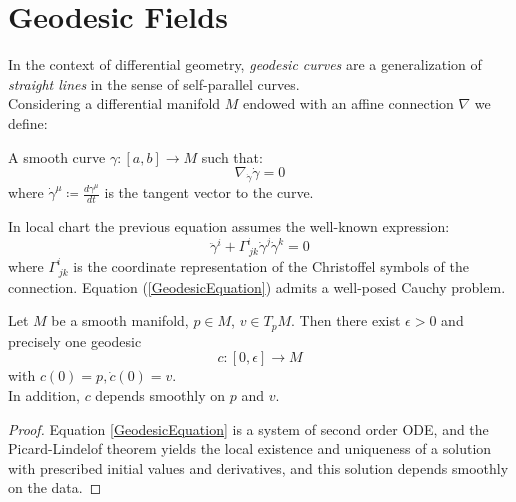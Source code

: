 \documentclass[Main]{subfiles}
\begin{document}
\setcounter{secnumdepth}{5} %
\renewcommand\thesubsubsection{\Alph{subsubsection}}
\renewcommand\theparagraph{\thesubsubsection.\alph{paragraph}}
\renewcommand\thesubparagraph{\theparagraph.\Roman{subparagraph}}

\chapter{Geodesic Fields}
	In the context of differential geometry, \emph{geodesic curves} are a generalization of \emph{straight lines}  in the sense of self-parallel curves.\\
	Considering a differential manifold $M$ endowed with an affine connection $\nabla$ we define:
	\begin{definition}[Geodesic]
		A smooth curve $\gamma:[a,b]\rightarrow M$ such that:
		\begin{equation}
			\nabla_{\dot{\gamma}}\dot{\gamma} =0
		\end{equation}
		where $\dot{\gamma}^\mu \coloneqq \frac{d \gamma^\mu}{d t}$ is the tangent vector to the curve.
	\end{definition}
	

		In local chart the previous equation assumes the well-known expression:
		\begin{equation}\label{GeodesicEquation}
			\ddot{\gamma}^i + \Gamma^i_{\, j k} \dot{\gamma}^j \dot{\gamma}^k = 0
		\end{equation}
		where $ \Gamma^i_{\, j k}$ is the coordinate representation of the Christoffel symbols of the connection.
		Equation (\ref{GeodesicEquation}) admits a well-posed Cauchy problem.
		\begin{theorem}
			Let $M$ be a smooth manifold, $p\in M$, $v \in T_p M$. 
			Then there exist $\epsilon>0$ and precisely one geodesic
			\begin{displaymath}
				c: [0,\epsilon]\rightarrow M
			\end{displaymath}
			with $c(0) = p , \dot{c}(0) = v$.\\
			 In addition, $c$ depends smoothly on $p$ and $v$.
		\end{theorem}
		\begin{proof}
		Equation \ref{GeodesicEquation} is a system of second order ODE, and the Picard-Lindelof theorem yields the local existence and uniqueness of a solution with prescribed initial values and derivatives, and this solution depends smoothly on the data.
		\end{proof}
\end{document}
